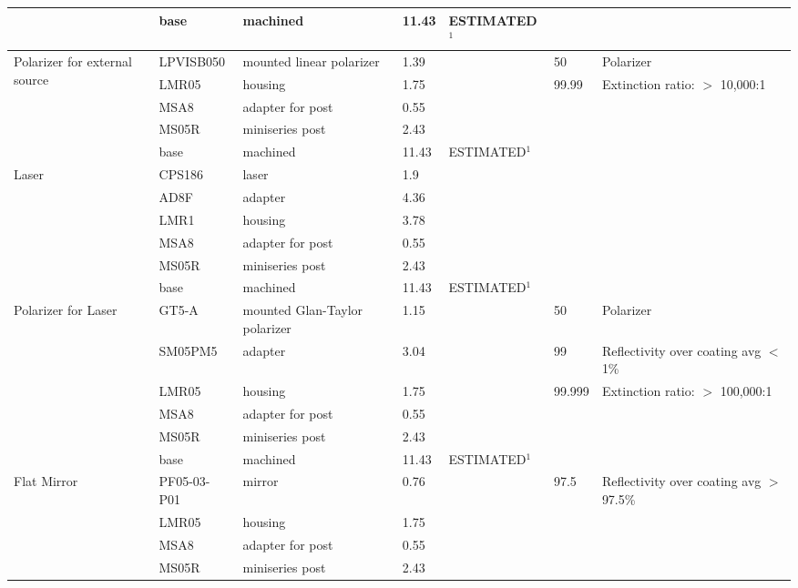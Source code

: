 \documentclass[12pt]{article}
\begin{document}
\begin{landscape}
\begin{center}
\begin{longtable}{| p{3.25cm} | p{2.2cm} | p{3cm} | p{1.75cm} | p{2.5cm} | p{1.55cm} | p{5cm} |}
          & base  & machined & 11.43 & ESTIMATED$^1$&       &  \\ \hline
    \multirow{5}{*}{\parbox{3.25cm}{Polarizer for external source}} & LPVISB050 & mounted linear polarizer & 1.39  &       & 50    & Polarizer \\ 
          & LMR05 & housing & 1.75  &       & 99.99 & Extinction ratio: $>$ 10,000:1 \\
          & MSA8  & adapter for post & 0.55  &       &       &  \\
          & MS05R & miniseries post & 2.43  &       &       &  \\
          & base  & machined & 11.43 & ESTIMATED$^1$ &       &  \\ \hline
    \multirow{5}{*}{Laser} & CPS186 & laser & 1.9   &       &       &  \\ 
          & AD8F  & adapter & 4.36  &       &       &  \\
          & LMR1  & housing & 3.78  &       &       &  \\
          & MSA8  & adapter for post & 0.55  &       &       &  \\
          & MS05R & miniseries post & 2.43  &       &       &  \\
          & base  & machined & 11.43 & ESTIMATED$^1$  &       &  \\ \hline
    \multirow{6}{*}{\parbox{3.25cm}{Polarizer for Laser}} & GT5-A & mounted Glan-Taylor polarizer & 1.15  &       & 50    & Polarizer \\ 
          & SM05PM5 & adapter & 3.04  &       & 99    & Reflectivity over coating avg $<$ 1\% \\
          & LMR05 & housing & 1.75  &       & 99.999 & Extinction ratio: $>$ 100,000:1 \\
          & MSA8  & adapter for post & 0.55  &       &       &  \\
          & MS05R & miniseries post & 2.43  &       &       &  \\
          & base  & machined & 11.43 & ESTIMATED$^1$ &       &  \\ \hline
    \multirow{5}{*}{Flat Mirror} & PF05-03-P01 & mirror & 0.76  &       & 97.5  & Reflectivity over coating avg $>$ 97.5\% \\ 
          & LMR05 & housing & 1.75  &       &       &  \\
          & MSA8  & adapter for post & 0.55  &       &       &  \\
          & MS05R & miniseries post & 2.43  &       &       &  \\

\end{longtable}
\end{center}
\end{landscape}
\end{document}
